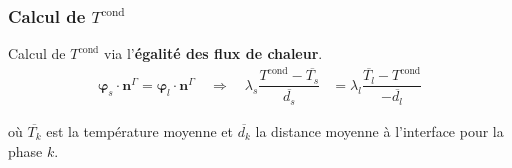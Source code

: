 \documentclass{beamer}
\newcommand{\inte}{\Gamma}
\newcommand{\cond}{\text{cond}}
\newcommand{\vect}[1]{\bm{#1}}
\newcommand{\norm}{\vect{n}}
\renewcommand{\frac}{\dfrac}
\newcommand{\Frac}{\displaystyle\frac}
\begin{document}
\begin{frame}
    \frametitle{Calcul de $ T^{\cond}$}
    \footnotesize
Calcul de $T^{\text{cond}}$ via l'\textbf{égalité des flux de chaleur}.
    \begin{align}
  \vect{\varphi}_s \cdot \norm^\inte= \vect{\varphi}_l \cdot \norm^\inte \quad \Rightarrow \quad \lambda_s \Frac{T^{\text{cond}}- \overline{T_s}}{\overline{d_s}} &= \lambda_l \Frac{\overline{T_l}-T^{\text{cond}}}{-\overline{d_l}} 
\end{align}

\textcolor{cea_texte!70}{où $\overline{T_k}$ est la température moyenne et  $\overline{d_k}$ la distance moyenne à l'interface  pour la phase $k$.}
\begin{columns}[c]
    \begin{column}{0.5 \textwidth}
\begin{center}
		\begin{tikzpicture}[scale = 0.55, every node/.style={scale=0.55}]
			
		\end{tikzpicture}

\end{center}
\end{column}
    \begin{column}{0.5 \textwidth}

\begin{center}
		\begin{tikzpicture}[scale = 0.5, every node/.style={scale=0.5}]
			
		\end{tikzpicture}

\end{center}
   \end{column}
   \end{columns}
\end{frame}
\end{document}
